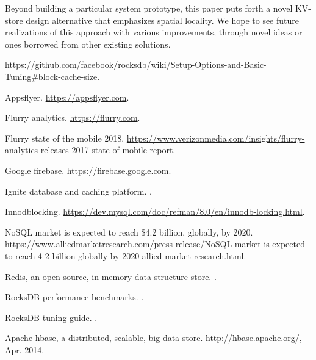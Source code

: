 \documentclass[sigplan,10pt]{acmart}
\begin{document}
Beyond building a particular system prototype, this paper puts forth a novel KV-store design alternative that emphasizes spatial locality. We hope to see future realizations of this approach with various improvements, through novel ideas or ones borrowed from other existing solutions. 



\clearpage
\begin{thebibliography}{10}

https://github.com/facebook/rocksdb/wiki/Setup-Options-and-Basic-Tuning\#block-cache-size.

Appsflyer.
\newblock \url{https://appsflyer.com}.

Flurry analytics.
\newblock \url{https://flurry.com}.

Flurry state of the mobile 2018.
\newblock
  \url{https://www.verizonmedia.com/insights/flurry-analytics-releases-2017-state-of-mobile-report}.

Google firebase.
\newblock \url{https://firebase.google.com}.

{Ignite } database and caching platform.
.

Innodblocking.
\newblock \url{https://dev.mysql.com/doc/refman/8.0/en/innodb-locking.html}.

{NoSQL} market is expected to reach \$4.2 billion, globally, by 2020.
\newblock
  {https://www.alliedmarketresearch.com/press-release/NoSQL-market-is-expected-to-reach-4-2-billion-globally-by-2020-allied-market-research.html}.

Redis, an open source, in-memory data structure store.
.

{RocksDB} performance benchmarks.
.

{RocksDB} tuning guide.
.

Apache hbase, a distributed, scalable, big data store.
\newblock \url{http://hbase.apache.org/}, Apr. 2014.


\end{thebibliography}
\end{document}
